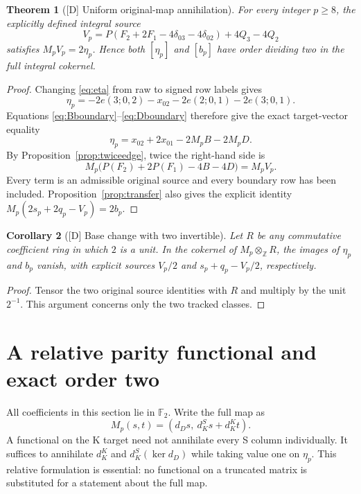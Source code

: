 \documentclass[11pt]{article}
\newtheorem{theorem}{Theorem}[section]
\newtheorem{corollary}[theorem]{Corollary}
\theoremstyle{definition}
\theoremstyle{remark}
\newcommand{\Z}{\mathbb Z}
\begin{document}
\begin{theorem}[{[D]} Uniform original-map annihilation]\label{thm:main}
For every integer $p\geq8$, the explicitly defined integral source
\begin{equation}\label{eq:V}
 V_p=P(F_2+2F_1-4\delta_{03}-4\delta_{02})+4Q_3-4Q_2
\end{equation}
satisfies $M_pV_p=2\eta_p$. Hence both $[\eta_p]$ and $[b_p]$ have
order dividing two in the full integral cokernel.
\end{theorem}
\begin{proof}
Changing \eqref{eq:eta} from raw to signed row labels gives
\[
 \eta_p=-2e(3;0,2)-x_{02}-2e(2;0,1)-2e(3;0,1).
\]
Equations \eqref{eq:Bboundary}--\eqref{eq:Dboundary} therefore give
the exact target-vector equality
\[
 \eta_p=x_{02}+2x_{01}-2M_pB-2M_pD.
\]
By Proposition~\ref{prop:twiceedge}, twice the right-hand side is
\[
 M_p\bigl(P(F_2)+2P(F_1)-4B-4D\bigr)=M_pV_p.
\]
Every term is an admissible original source and every boundary row has
been included. Proposition~\ref{prop:transfer} also gives the explicit
identity $M_p(2s_p+2q_p-V_p)=2b_p$.
\end{proof}

\begin{corollary}[{[D]} Base change with two invertible]\label{cor:basechange}
Let $R$ be any commutative coefficient ring in which $2$ is a unit.
In the cokernel of $M_p\otimes_{\Z}R$, the images of $\eta_p$ and
$b_p$ vanish, with explicit sources $V_p/2$ and
$s_p+q_p-V_p/2$, respectively.
\end{corollary}
\begin{proof}
Tensor the two original source identities with $R$ and multiply by the
unit $2^{-1}$. This argument concerns only the two tracked classes.
\end{proof}

\section{A relative parity functional and exact order two}\label{sec:parity}

All coefficients in this section lie in $\mathbb F_2$. Write the full map as
\[
 M_p(s,t)=(d_Ds,\ d_K^Ss+d_K^Kt).
\]
A functional on the K target need not annihilate every S column individually.
It suffices to annihilate $d_K^K$ and $d_K^S(\ker d_D)$ while taking
value one on $\eta_p$. This relative formulation is essential: no functional
on a truncated matrix is substituted for a statement about the full map.
\end{document}
